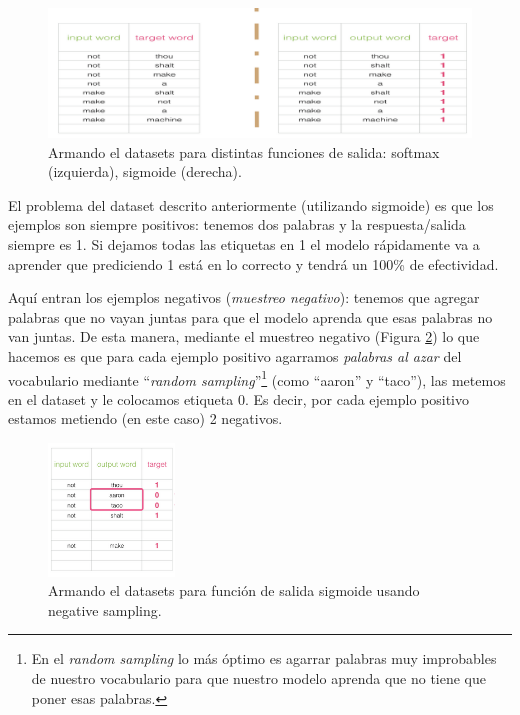 \documentclass[12pt,a4paper]{article}
\begin{document}
\begin{sloppypar}
\begin{figure}[H]    
 \centering
 \includegraphics[width=1\textwidth]{images/NLP/25.png}
 \caption{Armando el datasets para distintas funciones de salida: softmax (izquierda), sigmoide (derecha)\cite{datitos_nlp}.}
 \label{fig:Imagen_NLP_25}
\end{figure}

El problema del dataset descrito anteriormente (utilizando sigmoide) es que los ejemplos son siempre positivos: tenemos dos palabras y la respuesta/salida siempre es 1. Si dejamos todas las etiquetas en 1 el modelo rápidamente va a aprender que prediciendo 1 está en lo correcto y tendrá un 100\% de efectividad. 

Aquí entran los ejemplos negativos (\textit{muestreo negativo}): tenemos que agregar palabras que no vayan juntas para que el modelo aprenda que esas palabras no van juntas. De esta manera, mediante el muestreo negativo (Figura \ref{fig:Imagen_NLP_26}) lo que hacemos es que para cada ejemplo positivo agarramos \textit{palabras al azar} del vocabulario mediante “\textit{random sampling}”\footnote{En el \textit{random sampling} lo más óptimo es agarrar palabras muy improbables de nuestro vocabulario para que nuestro modelo aprenda que no tiene que poner esas palabras.} (como “aaron” y “taco”), las metemos en el dataset y le colocamos etiqueta 0. Es decir, por cada ejemplo positivo estamos metiendo (en este caso) 2 negativos. 

\begin{figure}[H]    
 \centering
 \includegraphics[width=0.3\textwidth]{images/NLP/26.png}
 \caption{Armando el datasets para función de salida sigmoide usando negative sampling\cite{datitos_nlp}.}
 \label{fig:Imagen_NLP_26}
\end{figure}


\end{sloppypar}
\end{document}

